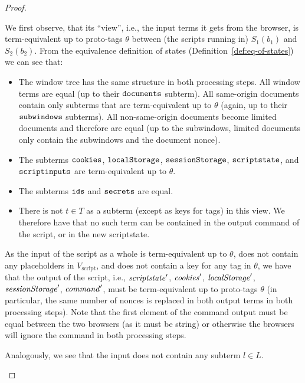 \documentclass[letterpaper,onecolumn,10pt]{article}
\begin{document}
\begin{proof}
\begin{description}
\begin{description}
\begin{enumerate}
          We first observe, that its ``view'', i.e., the input terms it
          gets from the browser, is term-equivalent up to proto-tags
          $\theta$ between (the scripts running in) $S_1(b_1)$ and
          $S_2(b_2)$. From the equivalence definition of states
          (Definition~\ref{def:eq-of-states}) we can see that:
          \begin{itemize}
          \item The window tree has the same structure in both
            processing steps. All window terms are equal (up to their
            $\mathtt{documents}$ subterm). All same-origin documents
            contain only subterms that are term-equivalent up to $\theta$ (again,
            up to their $\mathtt{subwindows}$ subterms). All
            non-same-origin documents become limited documents and
            therefore are equal (up to the subwindows, limited documents
            only contain the subwindows and the document nonce).
          \item The subterms $\mathtt{cookies}$, $\mathtt{localStorage}$,
            $\mathtt{sessionStorage}$, $\mathtt{scriptstate}$, and
            $\mathtt{scriptinputs}$ are term-equivalent up to $\theta$.
          \item The subterms $\mathtt{ids}$ and $\mathtt{secrets}$ are equal.
          \item There is not $t \in T$ as a subterm (except as keys for
            tags) in this view. We therefore have that no such term can
            be contained in the output command of the script, or in the
            new scriptstate.
          \end{itemize}
  
          As the input of the script as a whole is term-equivalent up to
          $\theta$, does not contain any placeholders in
          $V_\text{script}$, and does not contain a key for any tag in
          $\theta$, we have that the output of the script, i.e.,
          $\mathit{scriptstate}'$, $\mathit{cookies}'$, $\mathit{localStorage}'$,
          $\mathit{sessionStorage}'$, $\mathit{command}'$, must be
          term-equivalent up to proto-tags $\theta$ (in particular, the
          same number of nonces is replaced in both output terms in both
          processing steps). Note that the first element of the command
          output must be equal between the two browsers (as it must be
          string) or otherwise the browsers will ignore the command in
          both processing steps.
  
          Analogously, we see that the input does not contain any
          subterm $l \in L$. 
  

\end{enumerate}
\end{description}
\end{description}
\end{proof}
\end{document}
